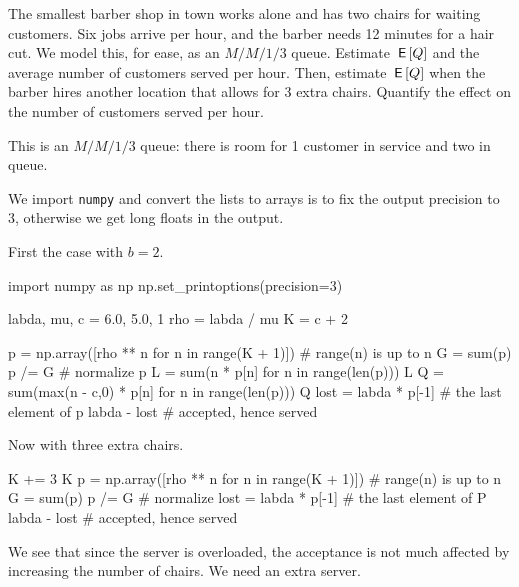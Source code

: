 \documentclass[stochastic-or.tex]{subfiles}
\begin{document}
\begin{exercise} The smallest barber shop in town works alone and has two chairs for waiting customers.
 Six jobs arrive per hour, and the barber needs 12 minutes for a hair cut. We model this, for ease, as an $M/M/1/3$ queue.
 Estimate $\,\mathsf{E}\left[Q\right]$ and the average number of customers served per hour.
 Then, estimate $\,\mathsf{E}\left[Q\right]$ when the barber hires another location that allows for 3 extra chairs.
 Quantify the effect on the number of customers served per hour.
\begin{solution}
This is an $M/M/1/3$ queue: there is room for 1 customer in service and two in queue.

We import \texttt{numpy} and convert the lists to arrays is to fix the output precision to 3, otherwise we get long floats in the output.

First the case with $b=2$.
\begin{pyconsole}[barber]
import numpy as np
np.set_printoptions(precision=3)

labda, mu, c = 6.0,  5.0, 1
rho = labda / mu
K = c + 2


p = np.array([rho ** n for n in range(K + 1)]) # range(n) is up to n
G = sum(p)
p /= G  # normalize
p
L = sum(n * p[n] for n in range(len(p)))
L
Q = sum(max(n - c,0) * p[n] for n in range(len(p)))
Q
lost = labda * p[-1]  # the last element of p
labda - lost # accepted, hence served
\end{pyconsole}

Now with three extra chairs.

\begin{pyconsole}[barber]
K += 3
K
p = np.array([rho ** n for n in range(K + 1)]) # range(n) is up to n
G = sum(p)
p /= G  # normalize
lost = labda * p[-1]  # the last element of P
labda - lost # accepted, hence served
\end{pyconsole}
We see that since the server is overloaded, the acceptance is not much affected by increasing the number of chairs.
We need an extra server.
\end{solution}
\end{exercise}
\end{document}
